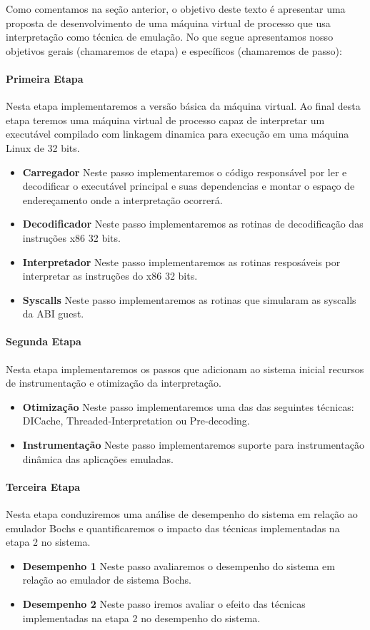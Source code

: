 \documentclass[11pt,twoside]{article}
\begin{document}
Como comentamos na seção anterior, o objetivo deste texto é apresentar
uma proposta de desenvolvimento de uma máquina virtual de processo que
usa interpretação como técnica de emulação. No que segue apresentamos
nosso objetivos gerais (chamaremos de etapa) e específicos (chamaremos
de passo):

\paragraph{Primeira Etapa} Nesta etapa implementaremos a versão básica da 
máquina virtual. Ao final desta etapa teremos uma máquina virtual de
processo capaz de interpretar um executável compilado com linkagem
dinamica para execução em uma máquina Linux de 32 bits.
	\begin{itemize}
		\item \textbf{Carregador} Neste passo implementaremos o código responsável
		por ler e decodificar o executável principal e suas dependencias
		e montar o espaço de endereçamento onde a interpretação ocorrerá.
		\item \textbf{Decodificador} Neste passo implementaremos as rotinas de 
		decodificação das instruções x86 32 bits.
		\item \textbf{Interpretador} Neste passo implementaremos as rotinas 
		resposáveis por interpretar as instruções do x86 32 bits.
		\item \textbf{Syscalls} Neste passo implementaremos as rotinas que simularam
		as syscalls da ABI guest.
	\end{itemize}

\paragraph{Segunda Etapa} Nesta etapa implementaremos os passos que adicionam
ao sistema inicial recursos de instrumentação e otimização da interpretação.
	\begin{itemize}
		\item \textbf{Otimização} Neste passo implementaremos uma das
		das seguintes técnicas: DICache, Threaded-Interpretation ou Pre-decoding.
		\item \textbf{Instrumentação} Neste passo implementaremos suporte para 
		instrumentação dinâmica das aplicações emuladas.
	\end{itemize}
 
\paragraph{Terceira Etapa} Nesta etapa conduziremos uma análise de desempenho do sistema
em relação ao emulador Bochs e quantificaremos o impacto das técnicas implementadas
na etapa 2 no sistema.
	\begin{itemize}
		\item \textbf{Desempenho 1} Neste passo avaliaremos o desempenho do sistema
		em relação ao emulador de sistema Bochs.
		\item \textbf{Desempenho 2} Neste passo iremos avaliar o efeito das técnicas 
		implementadas na etapa 2 no desempenho do sistema.
	\end{itemize}
\end{document}
